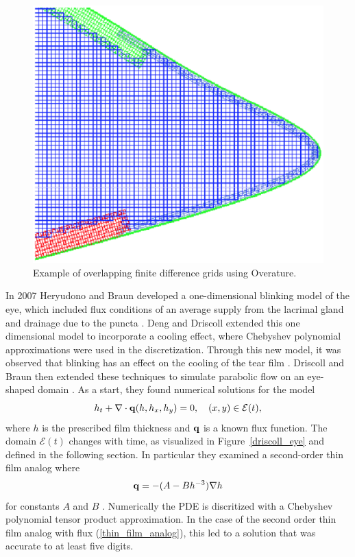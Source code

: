 \begin{figure}
	\centering
	\includegraphics[scale=0.6]{Chapter4/overature_eye}
	\caption{Example of overlapping finite difference grids using Overature. }
	\label{overature_eye}
\end{figure}


In 2007 Heryudono and Braun developed a one-dimensional blinking model of the eye, which included flux conditions of an average supply from the lacrimal gland and drainage due to the puncta \cite{heryudono2007single}. Deng and Driscoll extended this one dimensional model to incorporate a cooling effect, where Chebyshev polynomial approximations were used in the discretization. Through this new model, it was observed that blinking has an effect on the cooling of the tear film \cite{deng2013model,deng2014heat}. Driscoll and Braun then extended these techniques to simulate parabolic flow on an eye-shaped domain \cite{driscoll2018simulation}. As a start, they found numerical solutions for the model
\begin{equation}
\label{driscollPDE}
h_t + \nabla \cdot \mathbf{q} (h,h_x,h_y)=0, \quad (x,y) \in \mathcal{E}(t),
\end{equation}
where $h$ is the prescribed film thickness and $\mathbf{q}$ is a known flux function. The domain $\mathcal{E}(t)$ changes with time, as visualized in Figure~\ref{driscoll_eye} and defined in the following section. In particular they examined a second-order thin film analog where
\begin{equation}
\label{thin_film_analog}
\mathbf{q} = -(A-B h^{-3})\nabla h
\end{equation}
for constants $A$ and $B$ \cite{driscoll2018simulation}. Numerically the PDE is discritized with a Chebyshev polynomial tensor product approximation. In the case of the second order thin film analog with flux (\ref{thin_film_analog}), this led to a solution that was accurate to at least five digits.

